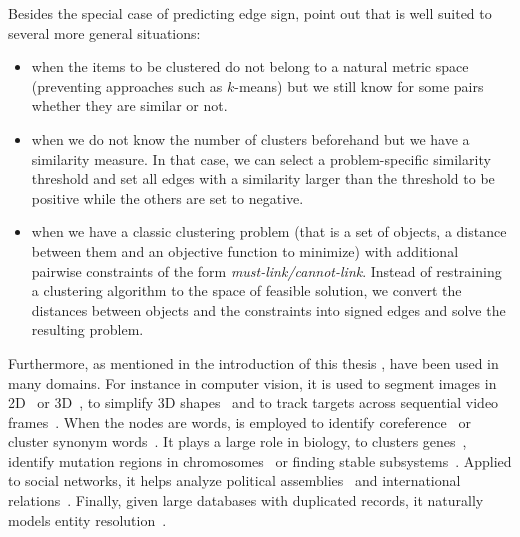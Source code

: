 Besides the special case of predicting edge sign, \textcite[Section 5]{Demaine2006} point out that
\pcc{} is well suited to several more general situations:
\begin{itemize}
   \item when the items to be clustered do not belong to a natural metric space (preventing
      approaches such as $k$-means) but we still know for some pairs whether they are similar or
      not.
   \item when we do not know the number of clusters beforehand but we have a similarity measure. In
      that case, we can select a problem-specific similarity threshold and set all edges with a
      similarity larger than the threshold to be positive while the others are set to negative.
   \item when we have a classic clustering problem (that is a set of objects, a distance between
      them and an objective function to minimize) with additional pairwise constraints of the form
      \emph{must-link/cannot-link}. Instead of restraining a clustering algorithm to the space of
      feasible solution, we convert the distances between objects and the constraints into signed
      edges and solve the resulting \pcc{} problem. 
\end{itemize}

Furthermore, as mentioned in the introduction of this thesis ,
\pcc{} have been used in many
domains. For instance in computer vision, it is used to segment images in
2D~\autocites{Kim2011}{Bagon2011}{CellSeg14} or 3D~\autocites{VolumeSegmentation12}{Beier2015}, to
simplify 3D shapes~\autocite{Shape3D17} and to track targets across sequential video
frames~\autocite{multiTracking15}. When the nodes are words, \pcc{} is employed to identify
coreference~\autocites{graphicalCoreference04}{Elsner2009} or cluster synonym
words~\autocite{SignedWordRatings}. It plays a large role in biology, to clusters
genes~\autocite{Ben-Dor99}, identify mutation regions in chromosomes~\autocite{Das2015} or finding
stable subsystems~\autocite{monotoneBiology07}. Applied to social networks, it helps analyze
political assemblies~\autocites{Mendonca2015}{Jiang2015}{BrazilCC17} and international
relations~\autocites{Traag2009}{CommunityUN12}. Finally, given large databases with duplicated
records, it naturally models entity
resolution~\autocites{Crosslingual07}{DeDup09}{LargeScaleDeDup09}{WeightedER14}.
